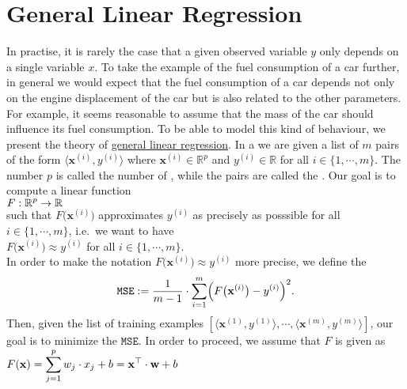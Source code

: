 \section{General Linear Regression}
In practise, it is rarely the case that a given observed variable $y$ only depends on a single variable $x$.
To take the example of the fuel consumption of a car further, in general we would expect that the fuel consumption
of a car depends not only on the engine displacement of the car but is also related to the other parameters.
For example, it seems reasonable to assume that the mass of the car should influence its fuel consumption.
To be able to model this kind of behaviour,  we present the theory of   
\href{https://en.wikipedia.org/wiki/Linear_regression}{general linear regression}.
In a  we are given a list of $m$ pairs of the form $\langle\mathbf{x}^{(i)}, y^{(i)} \rangle$ 
where $\mathbf{x}^{(i)} \in \mathbb{R}^p$ and $y^{(i)} \in \mathbb{R}$ for all $i \in \{1,\cdots,m\}$.  The
number $p$ is called the number of , while the pairs are called the . 
Our goal is to compute a linear function 
\\[0.2cm]
\hspace*{1.3cm}
$\displaystyle F:\mathbb{R}^p \rightarrow \mathbb{R}$
\\[0.2cm]  
such that $F\bigl(\mathbf{x}^{(i)}\bigr)$ approximates  $y^{(i)}$ as precisely as posssible
for all $i\in\{1,\cdots,m\}$, i.e.~we want to have
\\[0.2cm]
\hspace*{1.3cm}
$F\bigl(\mathbf{x}^{(i)}\bigr) \approx y^{(i)}$ \quad for all $i\in\{1,\cdots,m\}$.
\\[0.2cm]
In order to make the notation $F\bigl(\mathbf{x}^{(i)}\bigr) \approx y^{(i)}$ more precise, we
define the   
\begin{equation}
  \label{eq:squared-error-1}
  \mathtt{MSE} := \frac{1}{m-1} \cdot \sum\limits_{i=1}^{m} \Bigl(F\bigl(\mathbf{x}^{(i)}\bigr) - y^{(i)}\Bigr)^2. 
\end{equation}
Then, given the list of training examples
$[\langle \mathbf{x}^{(1)}, y^{(1)} \rangle, \cdots, \langle \mathbf{x}^{(m)}, y^{(m)} \rangle]$, our goal is to
minimize the $\mathtt{MSE}$.   
In order to proceed, we assume that $F$ is given as 
\\[0.2cm]
\hspace*{1.3cm}
$\displaystyle F(\mathbf{x}) = \sum\limits_{j=1}^p w_j \cdot x_j + b = \mathbf{x}^\top \cdot \mathbf{w} + b$ 
